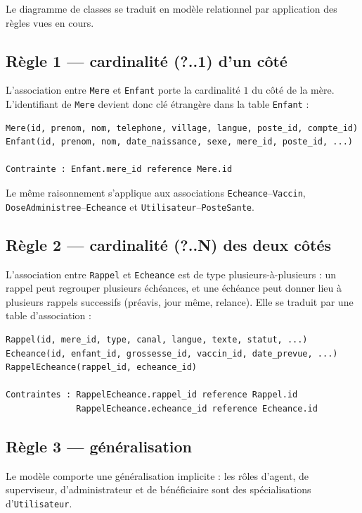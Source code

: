 \documentclass[11pt,a4paper]{report}
\begin{document}
Le diagramme de classes se traduit en modèle relationnel par application des
règles vues en cours.

\subsection{Règle 1 — cardinalité (?..1) d'un côté}

L'association entre \texttt{Mere} et \texttt{Enfant} porte la cardinalité
$1$ du côté de la mère. L'identifiant de \texttt{Mere} devient donc clé
étrangère dans la table \texttt{Enfant} :

\begin{lstlisting}
Mere(id, prenom, nom, telephone, village, langue, poste_id, compte_id)
Enfant(id, prenom, nom, date_naissance, sexe, mere_id, poste_id, ...)

Contrainte : Enfant.mere_id reference Mere.id
\end{lstlisting}

Le même raisonnement s'applique aux associations
\texttt{Echeance}--\texttt{Vaccin}, \texttt{DoseAdministree}--\texttt{Echeance}
et \texttt{Utilisateur}--\texttt{PosteSante}.

\subsection{Règle 2 — cardinalité (?..N) des deux côtés}

L'association entre \texttt{Rappel} et \texttt{Echeance} est de type
plusieurs-à-plusieurs : un rappel peut regrouper plusieurs échéances, et une
échéance peut donner lieu à plusieurs rappels successifs (préavis, jour
même, relance). Elle se traduit par une table d'association :

\begin{lstlisting}
Rappel(id, mere_id, type, canal, langue, texte, statut, ...)
Echeance(id, enfant_id, grossesse_id, vaccin_id, date_prevue, ...)
RappelEcheance(rappel_id, echeance_id)

Contraintes : RappelEcheance.rappel_id reference Rappel.id
              RappelEcheance.echeance_id reference Echeance.id
\end{lstlisting}

\subsection{Règle 3 — généralisation}

Le modèle comporte une généralisation implicite : les rôles d'agent, de
superviseur, d'administrateur et de bénéficiaire sont des spécialisations
d'\texttt{Utilisateur}.
\end{document}
